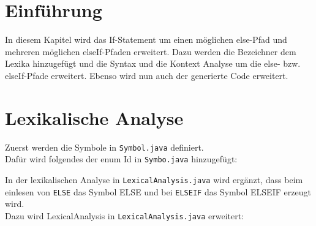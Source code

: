 \section{Einführung}
In diesem Kapitel wird das If-Statement um einen möglichen else-Pfad und mehreren möglichen elseIf-Pfaden erweitert.
Dazu werden die Bezeichner dem Lexika hinzugefügt und die Syntax und die Kontext Analyse um die else- bzw. elseIf-Pfade erweitert. Ebenso wird nun auch der generierte Code erweitert.

\section{Lexikalische Analyse}
Zuerst werden die Symbole in  \verb|Symbol.java| definiert.\\
Dafür wird folgendes der enum Id in \verb|Symbo.java| hinzugefügt:

In der lexikalischen Analyse in \verb|LexicalAnalysis.java| wird ergänzt, dass beim einlesen von \verb|ELSE| das Symbol ELSE und bei 
\verb|ELSEIF| das Symbol ELSEIF erzeugt wird.\\
Dazu wird LexicalAnalysis in \verb|LexicalAnalysis.java| erweitert:


